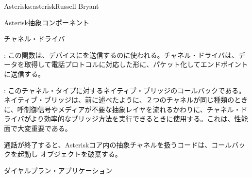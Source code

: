 \begin{aosachapter}{Asterisk}{s:asterisk}{Russell Bryant}
\begin{aosasect1}{Asterisk抽象コンポーネント}
\begin{aosasect2}{チャネル・ドライバ}
\begin{aosaitemize}
\item {}: この関数は、デバイスにを送信するのに使われる。チャネル・ドライバは、データを取得して電話プロトコルに対応した形に、パケット化してエンドポイントに送信する。

\item {}: このチャネル・タイプに対するネイティブ・ブリッジのコールバックである。ネイティブ・ブリッジは、前に述べたように、２つのチャネルが同じ種類のときに、呼制御信号やメディアが不要な抽象レイヤを流れるかわりに、チャネル・ドライバがより効率的なブリッジ方法を実行できるときに使用する。これは、性能面で大変重要である。

\end{aosaitemize}

\noindent
通話が終了すると、Asteriskコア内の抽象チャネルを扱うコードは、コールバックを起動し オブジェクトを破棄する。

\end{aosasect2}

\begin{aosasect2}{ダイヤルプラン・アプリケーション}


\end{aosasect2}
\end{aosasect1}
\end{aosachapter}
